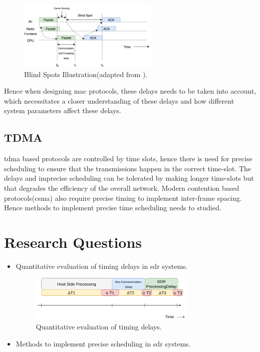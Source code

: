 \begin{figure}[!h]
\centering
\includegraphics[width=0.6\textwidth]{Figure/BlindSpots.png}
\caption{Blind Spots Illustration(adapted from \cite{schmid_experimental_2007}).}
\label{blind_spots}
\end{figure}

Hence when designing \ac{mac} protocols, these delays needs to be taken into account, which necessitates a closer understanding of these delays and how different system parameters affect these delays.

\subsection{TDMA}
\ac{tdma} based protocols are controlled by time slots, hence there is need for precise scheduling to ensure that the transmissions happen in the correct time-slot. The delays and imprecise scheduling can be tolerated by making longer time-slots but that degrades the efficiency of the overall network. Modern contention based protocols(\ac{csma}) also require precise timing to implement inter-frame spacing.\\

Hence methods to implement precise time scheduling needs to studied.

\section{Research Questions}
\begin{itemize}
\item{ Quantitative evaluation of timing delays in \ac{sdr} systems.}
\begin{figure}[!h]
\centering
\includegraphics[width=0.75\textwidth]{Figure/RQ1.png}
\caption{Quantitative evaluation of timing delays.}
\label{rq1}
\end{figure}
\item{ Methods to implement precise scheduling in \ac{sdr} systems.}
\end{itemize}

